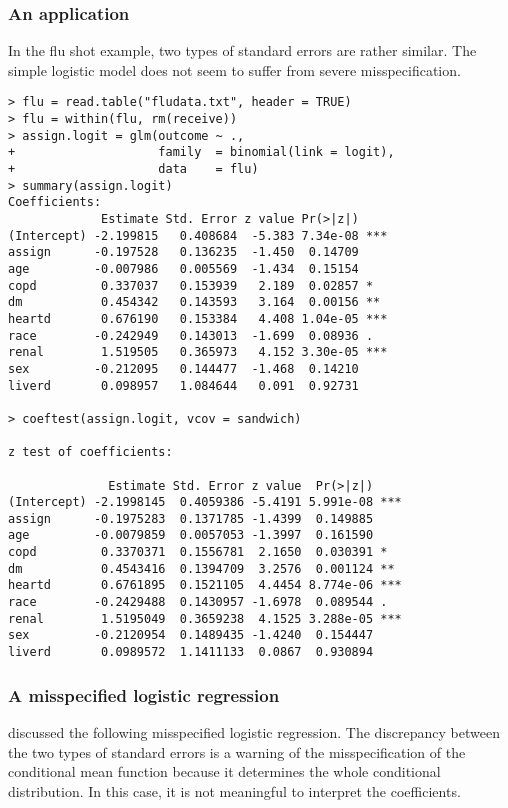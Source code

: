\subsubsection{An application}
In the flu shot example, two types of standard errors are rather similar. The simple logistic model does not seem to suffer from severe misspecification. 

\begin{lstlisting}
> flu = read.table("fludata.txt", header = TRUE)
> flu = within(flu, rm(receive))
> assign.logit = glm(outcome ~ ., 
+                    family  = binomial(link = logit), 
+                    data    = flu)
> summary(assign.logit)
Coefficients:
             Estimate Std. Error z value Pr(>|z|)    
(Intercept) -2.199815   0.408684  -5.383 7.34e-08 ***
assign      -0.197528   0.136235  -1.450  0.14709    
age         -0.007986   0.005569  -1.434  0.15154    
copd         0.337037   0.153939   2.189  0.02857 *  
dm           0.454342   0.143593   3.164  0.00156 ** 
heartd       0.676190   0.153384   4.408 1.04e-05 ***
race        -0.242949   0.143013  -1.699  0.08936 .  
renal        1.519505   0.365973   4.152 3.30e-05 ***
sex         -0.212095   0.144477  -1.468  0.14210    
liverd       0.098957   1.084644   0.091  0.92731    

> coeftest(assign.logit, vcov = sandwich)

z test of coefficients:

              Estimate Std. Error z value  Pr(>|z|)    
(Intercept) -2.1998145  0.4059386 -5.4191 5.991e-08 ***
assign      -0.1975283  0.1371785 -1.4399  0.149885    
age         -0.0079859  0.0057053 -1.3997  0.161590    
copd         0.3370371  0.1556781  2.1650  0.030391 *  
dm           0.4543416  0.1394709  3.2576  0.001124 ** 
heartd       0.6761895  0.1521105  4.4454 8.774e-06 ***
race        -0.2429488  0.1430957 -1.6978  0.089544 .  
renal        1.5195049  0.3659238  4.1525 3.288e-05 ***
sex         -0.2120954  0.1489435 -1.4240  0.154447    
liverd       0.0989572  1.1411133  0.0867  0.930894    
\end{lstlisting} 



\subsubsection{A misspecified logistic regression}

\citet{freedman2006so} discussed the following misspecified logistic regression. The discrepancy between the two types of standard errors is a warning of the misspecification of the conditional mean function because it determines the whole conditional distribution. In this case, it is not meaningful to interpret the coefficients. 

